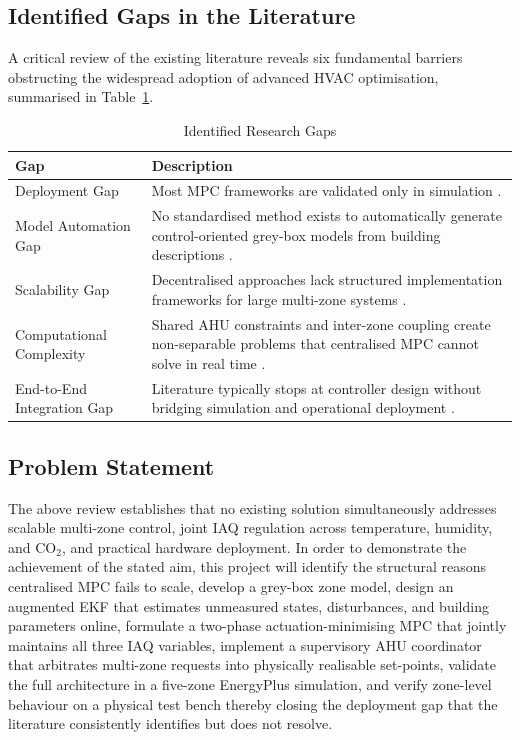 \documentclass[12pt, a4paper]{article}
\begin{document}
	\subsection{Identified Gaps in the Literature}
	
	A critical review of the existing literature reveals six fundamental barriers obstructing the widespread adoption of advanced HVAC optimisation, summarised in Table~\ref{tab:gaps}.
	
	\begin{table}[H]
		\centering
		\caption{Identified Research Gaps}
		\label{tab:gaps}
		\begin{tabular}{lp{9.5cm}}
			\toprule
			\textbf{Gap} & \textbf{Description} \\
			\midrule
			Deployment Gap & Most MPC frameworks are validated only in simulation \citep{aframTheoryApplicationsHVAC2014, balaliEnergyModellingControl2023}. \\
			Model Automation Gap & No standardised method exists to automatically generate control-oriented grey-box models from building descriptions \citep{balaliEnergyModellingControl2023}. \\
			Scalability Gap & Decentralised approaches lack structured implementation frameworks for large multi-zone systems \citep{yangHVACEnergyCost2019}. \\
			Computational Complexity & Shared AHU constraints and inter-zone coupling create non-separable problems that centralised MPC cannot solve in real time \citep{yangHVACEnergyCost2019}. \\
			End-to-End Integration Gap & Literature typically stops at controller design without bridging simulation and operational deployment \citep{aframTheoryApplicationsHVAC2014}. \\
			\bottomrule
		\end{tabular}
	\end{table}
	
	\subsection{Problem Statement}
	
	The above review establishes that no existing solution simultaneously addresses scalable multi-zone control, joint IAQ regulation across temperature, humidity, and CO$_2$, and practical hardware deployment. In order to demonstrate the achievement of the stated aim, this project will identify the structural reasons centralised MPC fails to scale, develop a grey-box zone model, design an augmented EKF that estimates unmeasured states, disturbances, and building parameters online, formulate a two-phase actuation-minimising MPC that jointly maintains all three IAQ variables, implement a supervisory AHU coordinator that arbitrates multi-zone requests into physically realisable set-points, validate the full architecture in a five-zone EnergyPlus simulation, and verify zone-level behaviour on a physical test bench thereby closing the deployment gap that the literature consistently identifies but does not resolve.
	
\end{document}
